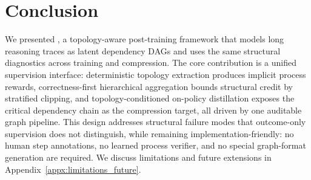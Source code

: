 \section{Conclusion}
\label{sec:conclusion}

We presented \method, a topology-aware post-training framework that models long reasoning traces as latent dependency DAGs and uses the same structural diagnostics across training and compression.
The core contribution is a unified supervision interface: deterministic topology extraction produces implicit process rewards, correctness-first hierarchical aggregation bounds structural credit by stratified clipping, and topology-conditioned on-policy distillation exposes the critical dependency chain as the compression target, all driven by one auditable graph pipeline.
This design addresses structural failure modes that outcome-only supervision does not distinguish, while remaining implementation-friendly: no human step annotations, no learned process verifier, and no special graph-format generation are required.
We discuss limitations and future extensions in Appendix~\ref{appx:limitations_future}.
